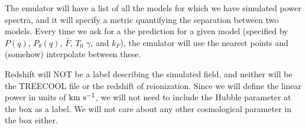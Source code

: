 The emulator will have a list of all the models for which we have simulated
power spectra, and it will specify a metric quantifying the separation
between two models.
Every time we ask for a the prediction for a given model (specified by
$P(q)$, $P_\theta(q)$, $\bar F$, $T_0$ $\gamma$, and $k_F$), the emulator
will use the nearest points and (somehow) interpolate between these.

Redshift will NOT be a label describing the simulated field, and neither
will be the TREECOOL file or the redshift of reionization.
Since we will define the linear power in units of ${\rm km~s^{-1}}$, we will not 
need to include the Hubble parameter at the box as a label.
We will not care about any other cosmological parameter in the box
either.
